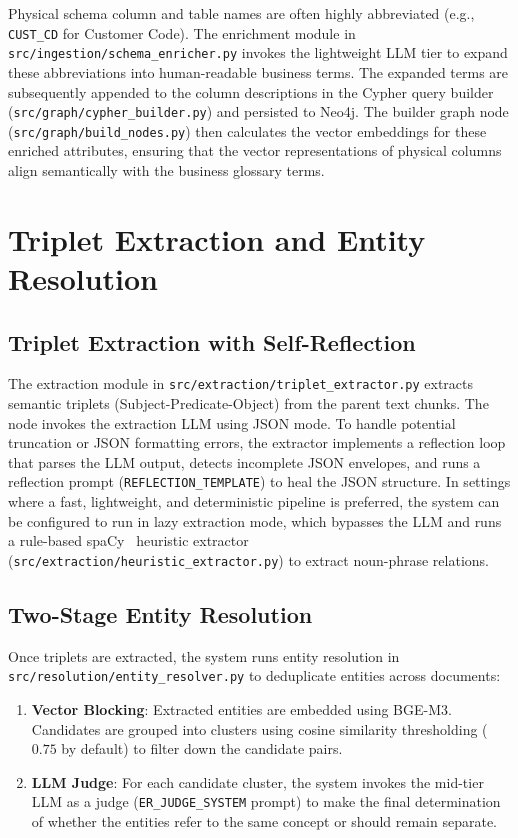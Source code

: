 Physical schema column and table names are often highly abbreviated (e.g., \texttt{CUST\_CD} for Customer Code). The enrichment module in \texttt{src/ingestion/schema\_enricher.py} invokes the lightweight LLM tier to expand these abbreviations into human-readable business terms. The expanded terms are subsequently appended to the column descriptions in the Cypher query builder (\texttt{src/graph/cypher\_builder.py}) and persisted to Neo4j. The builder graph node (\texttt{src/graph/build\_nodes.py}) then calculates the vector embeddings for these enriched attributes, ensuring that the vector representations of physical columns align semantically with the business glossary terms.

\section{Triplet Extraction and Entity Resolution}
\label{sec:imp:extraction_resolution}

\subsection{Triplet Extraction with Self-Reflection}
\label{sec:imp:triplet_extractor}

The extraction module in \texttt{src/extraction/triplet\_extractor.py} extracts semantic triplets (Subject-Predicate-Object) from the parent text chunks. The node invokes the extraction LLM using JSON mode. To handle potential truncation or JSON formatting errors, the extractor implements a reflection loop that parses the LLM output, detects incomplete JSON envelopes, and runs a reflection prompt (\texttt{REFLECTION\_TEMPLATE}) to heal the JSON structure. In settings where a fast, lightweight, and deterministic pipeline is preferred, the system can be configured to run in lazy extraction mode, which bypasses the LLM and runs a rule-based spaCy~\cite{honnibal2020spacy} heuristic extractor (\texttt{src/extraction/heuristic\_extractor.py}) to extract noun-phrase relations.

\subsection{Two-Stage Entity Resolution}
\label{sec:imp:entity_resolver}

Once triplets are extracted, the system runs entity resolution in \texttt{src/resolution/entity\_resolver.py} to deduplicate entities across documents:
\begin{enumerate}
    \item \textbf{Vector Blocking}: Extracted entities are embedded using BGE-M3. Candidates are grouped into clusters using cosine similarity thresholding ($0.75$ by default) to filter down the candidate pairs.
    \item \textbf{LLM Judge}: For each candidate cluster, the system invokes the mid-tier LLM as a judge (\texttt{ER\_JUDGE\_SYSTEM} prompt) to make the final determination of whether the entities refer to the same concept or should remain separate.
\end{enumerate}

